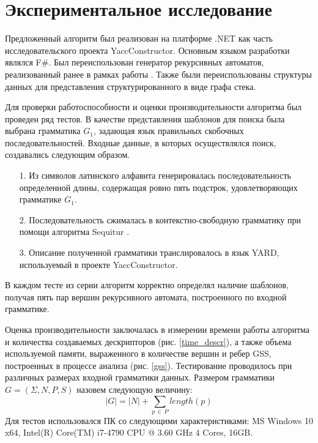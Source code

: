 \section{Экспериментальное исследование}

Предложенный алгоритм был реализован на платформе .NET как часть исследовательского проекта YaccConstructor. Основным языком разработки являлся F$\#$. Был переиспользован генератор рекурсивных автоматов, реализованный ранее в рамках работы \cite{Gorokhov2017ebnf}. Также были переиспользованы структуры данных для представления структурированного в виде графа стека.

Для проверки работоспособности и оценки производительности алгоритма был проведен ряд тестов. В качестве представления шаблонов для поиска была выбрана грамматика $G_1$, задающая язык правильных скобочных последовательностей. Входные данные, в которых осуществлялся поиск, создавались следующим образом.
\begin{itemize}
	\item[1.] Из символов латинского алфавита генерировалась последовательность определенной длины, содержащая ровно пять подстрок, удовлетворяющих грамматике $G_1$.
	\item[2.] Последовательность сжималась в контекстно-свободную грамматику при помощи алгоритма Sequitur \cite{sequitur, sequitur_url}.
	\item[3.] Описание полученной грамматики транслировалось в язык YARD, используемый в проекте YaccConstructor.
\end{itemize}
В каждом тесте из серии алгоритм корректно определял наличие шаблонов, получая пять пар вершин рекурсивного автомата, построенного по входной  грамматике. 

Оценка производительности заключалась в измерении времени работы алгоритма и количества создаваемых дескрипторов (рис. \ref{time_descr}), а также объема используемой памяти, выраженного в количестве вершин и ребер GSS, построенных в процессе анализа (рис. \ref{gss}). Тестирование проводилось при различных размерах входной грамматики данных. Размером грамматики $G = (\Sigma, N, P, S)$ назовем следующую величину:
$$|G| = |N| + \sum_{p \, \in \, P} length(p)$$ 
Для тестов использовался ПК со следующими характеристиками: MS Windows 10 x64, Intel(R) Core(TM) i7-4790 CPU @ 3.60 GHz 4 Cores, 16GB.

